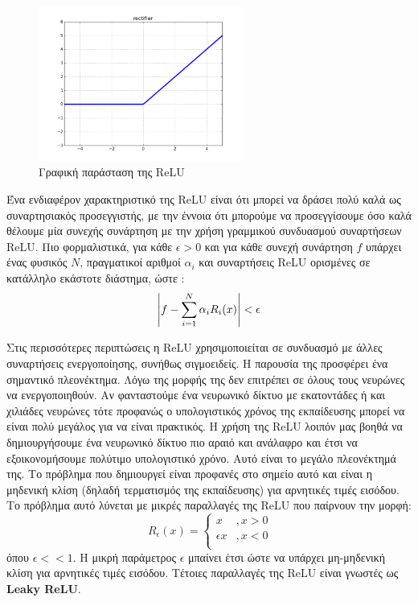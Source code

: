 \documentclass[11pt]{article} %
\numberwithin{equation}{subsection}
\begin{document}
\begin{figure}[h]
    \centering
    \includegraphics[width=0.6\textwidth]{relu}
    \caption{Γραφική παράσταση της ReLU}
    \label{fig:RELU curve}
\end{figure}

Ένα ενδιαφέρον χαρακτηριστικό της ReLU είναι ότι μπορεί να δράσει πολύ καλά ως συναρτησιακός προσεγγιστής, με την έννοια ότι μπορούμε να προσεγγίσουμε όσο καλά θέλουμε μία συνεχής συνάρτηση με την χρήση γραμμικού συνδυασμού συναρτήσεων ReLU. Πιο φορμαλιστικά, για κάθε $\epsilon > 0$ και για κάθε συνεχή συνάρτηση $f$ υπάρχει ένας φυσικός $Ν$, πραγματικοί αριθμοί $\alpha_i$ και συναρτήσεις ReLU ορισμένες σε κατάλληλο εκάστοτε διάστημα, ώστε :
\begin{align*}
\displaystyle \abs{f - \sum_{i=1}^{N} \alpha_i R_i(x)} < \epsilon
\end{align*}

Στις περισσότερες περιπτώσεις η ReLU χρησιμοποιείται σε συνδυασμό με άλλες συναρτήσεις ενεργοποίησης, συνήθως σιγμοειδείς. Η παρουσία της προσφέρει ένα σημαντικό πλεονέκτημα. Λόγω της μορφής της δεν επιτρέπει σε όλους τους νευρώνες να ενεργοποιηθούν. Αν φανταστούμε ένα νευρωνικό δίκτυο με εκατοντάδες ή και χιλιάδες νευρώνες τότε προφανώς ο υπολογιστικός χρόνος της εκπαίδευσης μπορεί να είναι πολύ μεγάλος για να είναι πρακτικός. Η χρήση της ReLU λοιπόν μας βοηθά να δημιουργήσουμε ένα νευρωνικό δίκτυο πιο αραιό και ανάλαφρο και έτσι να εξοικονομήσουμε πολύτιμο υπολογιστικό χρόνο. Αυτό είναι το μεγάλο πλεονέκτημά της. Το πρόβλημα που δημιουργεί είναι προφανές στο σημείο αυτό και είναι η μηδενική κλίση (δηλαδή τερματισμός της εκπαίδευσης) για αρνητικές τιμές εισόδου. Το πρόβλημα αυτό λύνεται με μικρές παραλλαγές της ReLU που παίρνουν την μορφή:
\[ 
\ R_\epsilon(x) = \left\{
\begin{array}{ll}
      x & , x > 0 \\
      \epsilon x & , x < 0 \\
\end{array} 
\right. 
\]
όπου $\epsilon << 1$. Η μικρή παράμετρος $\epsilon$ μπαίνει έτσι ώστε να υπάρχει μη-μηδενική κλίση για αρνητικές τιμές εισόδου. Τέτοιες παραλλαγές της ReLU είναι γνωστές ως \textbf{Leaky ReLU}.\\
\end{document}
